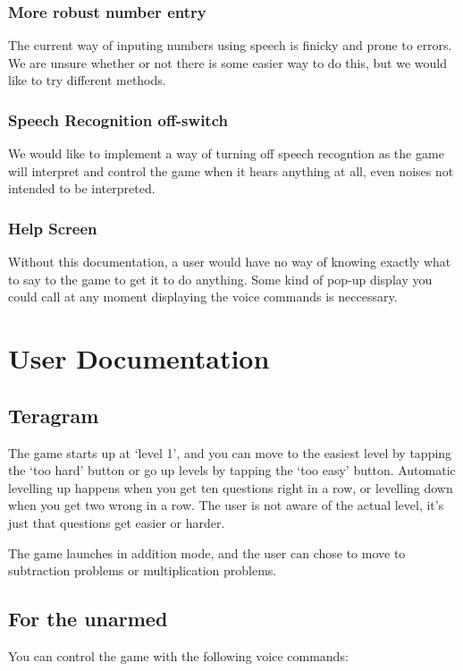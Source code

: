 \documentclass[11pt, oneside]{article}
\begin{document}
\subsubsection*{More robust number entry}
The current way of inputing numbers using speech is finicky and prone to
errors. We are unsure whether or not there is some easier way to do this,
but we would like to try different methods.

\subsubsection*{Speech Recognition off-switch}
We would like to implement a way of turning off speech recogntion as
the game will interpret and control the game when it hears anything at
all, even noises not intended to be interpreted.

\subsubsection*{Help Screen}
Without this documentation, a user would have no way of knowing exactly 
what to say to the game to get it to do anything. Some kind of pop-up 
display you could call at any moment displaying the voice commands is
neccessary.

\pagebreak

\section*{User Documentation}

\subsection*{Teragram}
The game starts up at `level 1', and you can move to the easiest level
by tapping the `too hard' button or go up levels by tapping the `too
easy' button. Automatic levelling up happens when you get ten
questions right in a row, or levelling down when you get two wrong in
a row. The user is not aware of the actual level, it's just that
questions get easier or harder.

The game launches in addition mode, and the user can chose to move to
subtraction problems or multiplication problems.


\subsection*{For the unarmed}

You can control the game with the following voice commands:
\end{document}

